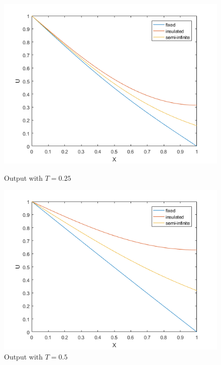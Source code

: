 \documentclass[10pt,a4paper]{report}
\begin{document}
\begin{figure}[ht]
\begin{minipage}[b]{0.5\linewidth}
\centering
\includegraphics[width=\textwidth]{anal025}
\caption{Output with $T=0.25$}
\end{minipage}
\hspace{0.5cm}
\begin{minipage}[b]{0.5\linewidth}
\centering
\includegraphics[width=\textwidth]{anal05}
\caption{Output with $T=0.5$}
\end{minipage}
\end{figure}
\end{document}
